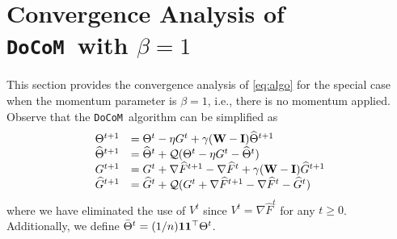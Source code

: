 \documentclass[10pt]{article} %
\theoremstyle{plain}
\theoremstyle{definition}
\theoremstyle{remark}
\newcommand{\aname}{{\tt DoCoM}}
\newcommand{\stocgrdF}{\nabla \widehat{F}}
\newcommand{\hatTheta}{\widehat{\Theta}}
\newcommand{\hatG}{\widehat{G}}
\newcommand{\ConstS}{\mathbb{C}_\sigma}
\newcommand{\InitG}{\overline{G}_0}
\begin{document}


\section{Convergence Analysis of \aname~with $\beta = 1$}\label{app:betaequalone}
This section provides the convergence analysis of \eqref{eq:algo} for the special case when the momentum parameter is $\beta = 1$, i.e., there is no momentum applied. Observe that the \aname~algorithm can be simplified as
\begin{equation*}
    \begin{array}{ll}
        \Theta^{t+1} & = \Theta^t - \eta G^t + \gamma ( {\bf W} - {\bf I} ) \hatTheta^{t+1} \\
        \hatTheta^{t+1} & = \hatTheta^t + {\cal Q} ( \Theta^t - \eta G^t - \hatTheta^t ) \\
        G^{t+1} & = G^t + \stocgrdF^{t+1} - \stocgrdF^{t} + \gamma ( {\bf W} - {\bf I} ) \hatG^{t+1} \\
        \hatG^{t+1} & = \hatG^t + {\cal Q} ( G^t + \stocgrdF^{t+1} - \stocgrdF^{t} - \hatG^t )
    \end{array}
\end{equation*}
where we have eliminated the use of $V^t$ since $V^t = \stocgrdF^t$ for any $t \geq 0$. Additionally, we define $\bar{\Theta}^t = (1/n) {\bf 1} {\bf 1}^\top \Theta^t$. 
\end{document}
